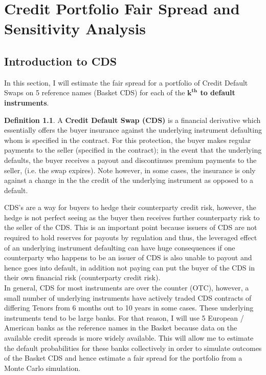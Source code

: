 \documentclass{report}
\theoremstyle{plain}
\theoremstyle{definition}
\newtheorem{defn}[thm]{Definition} %
\begin{document}
\part{Credit Portfolio Fair Spread and Sensitivity Analysis}

\chapter{Introduction to CDS}

In this section, I will estimate the fair spread for a portfolio of Credit Default Swaps on 5 reference names (Basket CDS) for each of the \textbf{$\mathbf{k^{th}}$ to default instruments}. 

\begin{defn}A \textbf{Credit Default Swap (CDS)} is a financial derivative which essentially offers the buyer insurance against the underlying instrument defaulting whom is specified in the contract. For this protection, the buyer makes regular payments to the seller (specified in the contract); in the event that the underlying defaults, the buyer receives a payout and discontinues premium payments to the seller, (i.e. the swap expires). Note however, in some cases, the insurance is only against a change in the the credit of the underlying instrument as opposed to a default.\end{defn}

CDS's are a way for buyers to hedge their counterparty credit risk, however, the hedge is not perfect seeing as the buyer then receives further counterparty risk to the seller of the CDS. This is an important point because issuers of CDS are not required to hold reserves for payouts by regulation and thus, the leveraged effect of an underlying instrument defaulting can have huge consequences if one counterparty who happens to be an issuer of CDS is also unable to payout and hence goes into default, in addition not paying can put the buyer of the CDS in their own financial risk (counterparty credit risk).\\

In general, CDS for most instruments are over the counter (OTC), however, a small number of underlying instruments have actively traded CDS contracts of differing Tenors from 6 months out to 10 years in some cases. These underlying instruments tend to be large banks. For that reason, I will use 5 European / American banks as the reference names in the Basket because data on the available credit spreads is more widely available. This will allow me to estimate the default probabilities for these banks collectively in order to simulate outcomes of the Basket CDS and hence estimate a fair spread for the portfolio from a Monte Carlo simulation.\\
\end{document}

